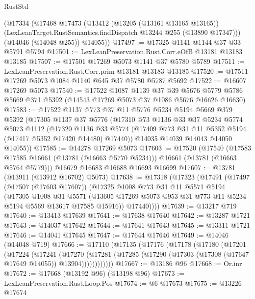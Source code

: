 \begin{lexlean}{RustStd}
\begin{coremodule}
    (@17334
      (@17468
        @17473
        (@13412
          (@13205 (@13161 @13165 @13165))
          (LexLeanTarget.RustSemantics.findDispatch @13244 @255 (@13890 @17347)))
        (@14046 (@14048 @255))
        @14055))
@17497 := @17325 @1141 @1144 @37 @33 @5791 @5794
@17501 := LexLeanPreservation.Rust.Corr.eOfB @13181 @13183 @13185
@17507 := @17501 @17269 @5073 @1141 @37 @5780 @5789
@17511 := LexLeanPreservation.Rust.Corr.prim @13181 @13183 @13185
@17520 := @17511 @17269 @5073 @1084 @1140 @645 @37 @5780 @5787 @5692
@17522 := @16607 @17269 @5073
@17540 := @17522
    @1087
    @1139
    @37
    @39
    @5676
    @5779
    @5786
    @5669
    @371
    @5392
    (@14543 @17269 @5073 @37 @1086 @5676 @16626 @16630)
@17583 := @17522
    @1137
    @773
    @37
    @11
    @5776
    @5234
    @5194
    @5669
    @379
    @5392
    (@17305
      @1137
      @37
      @5776
      (@17310
        @73
        @1136
        @33
        @37
        @5234
        @5774
        @5073
        @1112
        (@17320
          @1136
          @33
          @5774
          (@17409 @773 @31 @11 @5352 @5194 (@17417 @5352 @17420 @14480) @17440))
        @14035
        @14039
        @14043
        @14050
        @14055))
@17585 := @14278 @17269 @5073
@17603 := @17520
    (@17540
      (@17583 @17585 @16661 (@13781 (@16663 @5770 @5234)))
      @16661
      (@13781 (@16663 @5764 @5779)))
    @16679
    @16683
    @16688
    @16693
    @16699
@17607 := @13781 (@13911 (@13912 @16702) @5073)
@17638 := @17318
    (@17323
      (@17491
        (@17497
          (@17507 (@17603 @17607))
          (@17325
            @1008
            @773
            @31
            @11
            @5571
            @5194
            (@17305
              @1008
              @31
              @5571
              (@13605 @17269 @5073 @953 @31 @773 @11 @5234 @5194 @5569 @13617 @17585 @15916))
            @17440))))
@17639 := @13217 @719
@17640 := @13413 @17639
@17641 := @17638 @17640
@17642 := @13287 @1721
@17643 := @14037 @17642
@17644 := @17641 @17643
@17645 := @13311 @1721
@17646 := @14041 @17645
@17647 := @17644 @17646
@17649 := @14046 (@14048 @719)
@17666 := @17110
    (@17135
      (@17176
        (@17178
          (@17180
            (@17201
              (@17224
                (@17241
                  (@17270
                    (@17281
                      (@17285 (@17290 (@17303 (@17308 (@17647 @17649 @14055)) @13904))))))))))))
@17667 := @13186 @96
@17668 := Or.inr
@17672 := @17668 (@13192 @96) (@13198 @96)
@17673 := LexLeanPreservation.Rust.Loop.Pos
@17674 := @6 @17673
@17675 := @13226 @17674

\end{coremodule}
\end{lexlean}
